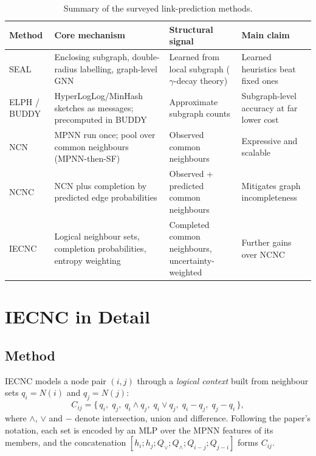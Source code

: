\documentclass[11pt,a4paper]{article}
\begin{document}
\begin{table}[t]
\centering
\caption{Summary of the surveyed link-prediction methods.}
\label{tab:methods}
\small
\begin{tabular}{@{}p{2.1cm}p{4.9cm}p{3.7cm}p{3.6cm}@{}}
\toprule
\textbf{Method} & \textbf{Core mechanism} & \textbf{Structural signal} & \textbf{Main claim}\\
\midrule
SEAL \cite{zhang2018seal} & Enclosing subgraph, double-radius labelling, graph-level GNN & Learned from local subgraph ($\gamma$-decay theory) & Learned heuristics beat fixed ones\\
ELPH / BUDDY \cite{chamberlain2023elph} & HyperLogLog/MinHash sketches as messages; precomputed in BUDDY & Approximate subgraph counts & Subgraph-level accuracy at far lower cost\\
NCN \cite{wang2024ncnc} & MPNN run once; pool over common neighbours (MPNN-then-SF) & Observed common neighbours & Expressive and scalable\\
NCNC \cite{wang2024ncnc} & NCN plus completion by predicted edge probabilities & Observed + predicted common neighbours & Mitigates graph incompleteness\\
IECNC \cite{zhou2025iecnc} & Logical neighbour sets, completion probabilities, entropy weighting & Completed common neighbours, uncertainty-weighted & Further gains over NCNC\\
\bottomrule
\end{tabular}
\end{table}

\section{IECNC in Detail}
\subsection{Method}
IECNC \cite{zhou2025iecnc} models a node pair $(i,j)$ through a \emph{logical context}
built from neighbour sets $q_i=N(i)$ and $q_j=N(j)$:
\begin{equation}
C_{ij}=\{\,q_i,\; q_j,\; q_i\wedge q_j,\; q_i\vee q_j,\; q_i-q_j,\; q_j-q_i\,\},
\end{equation}
where $\wedge$, $\vee$ and $-$ denote intersection, union and difference. Following the
paper's notation, each set is encoded by an MLP over the MPNN features of its members, and
the concatenation $[h_i;h_j;Q_\vee;Q_\wedge;Q_{i-j};Q_{j-i}]$ forms $C_{ij}$.
\end{document}
